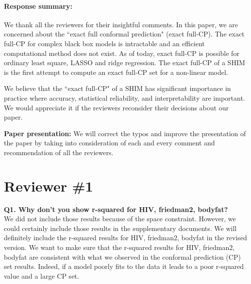 \documentclass{article}
\begin{document}
\paragraph{Response summary:}
We thank all the reviewers for their insightful comments. In this paper, we are concerned about the ``exact full conformal prediction" (exact full-CP). The exact full-CP for complex black box models is intractable and an efficient computational method does not exist. As of today, exact full-CP is possible for ordinary least square, LASSO and ridge regression. The exact full-CP of a SHIM is the first attempt to compute an exact full-CP set for a non-linear model. 
\vspace{0.5cm}

We believe that the ``exact full-CP" of a SHIM has significant importance in practice where accuracy, statistical reliability, and interpretability are important. We would appreciate it if the reviewers reconsider their decisions about our paper. 


\vspace{0.5cm}

\textbf{Paper presentation:} We will correct the typos and improve the presentation of the paper by taking into consideration of each and every comment and recommendation of all the reviewers.


 

\section*{Reviewer \#1}

\textbf{Q1. Why don't you show r-squared for HIV, friedman2, bodyfat?}\\

We did not include those results because of the space constraint. However, we could certainly include those results in the supplementary documents. We will definitely include the r-squared results for HIV, friedman2, bodyfat in the revised version. We want to make sure that the r-squared results for HIV, friedman2, bodyfat are consistent with what we observed in the conformal prediction (CP) set results. Indeed, if a model poorly fits to the data it leads to a poor r-squared value and a large CP set.\\
\end{document}

